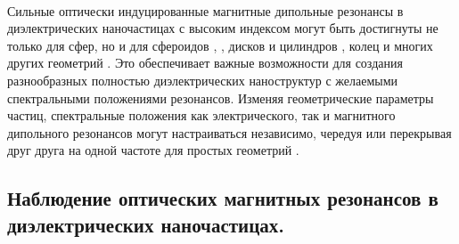 \\
\hspace*{2mm}
Сильные оптически индуцированные магнитные дипольные резонансы в диэлектрических наночастицах с высоким индексом могут быть достигнуты не только для сфер, но и для сфероидов \cite{articleDirVi}, \cite{optScatShper}, дисков и цилиндров \cite{multLightScat}, колец \cite{contrMagnModes} и многих других геометрий \cite{nearInfrMR}. Это обеспечивает важные возможности для создания разнообразных полностью диэлектрических наноструктур с желаемыми спектральными положениями резонансов. Изменяя геометрические параметры частиц, спектральные положения как электрического, так и магнитного дипольного резонансов могут настраиваться независимо, чередуя или перекрывая друг друга на одной частоте для простых геометрий \cite{optScatDeilectrHightIndex}.


\subsection{Наблюдение оптических магнитных резонансов в диэлектрических наночастицах.}

